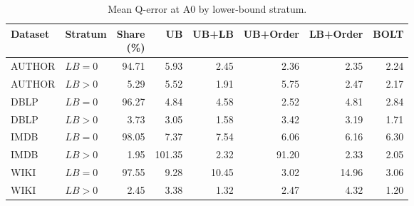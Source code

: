 \begin{table}[!t]
\centering
\small
\setlength{\tabcolsep}{1.5pt}
\caption{Mean Q-error at A0 by lower-bound stratum.}
\label{tab:lb-conditional}
\begin{tabular*}{\columnwidth}{@{\extracolsep{\fill}}llrrrrrr@{}}
\toprule
Dataset & Stratum & \shortstack{Share\\(\%)} & UB & UB+LB & UB+Order & LB+Order & BOLT \\
\midrule
AUTHOR & $LB=0$ & 94.71 & 5.93 & 2.45 & 2.36 & 2.35 & 2.24 \\
AUTHOR & $LB>0$ & 5.29 & 5.52 & 1.91 & 5.75 & 2.47 & 2.17 \\
DBLP & $LB=0$ & 96.27 & 4.84 & 4.58 & 2.52 & 4.81 & 2.84 \\
DBLP & $LB>0$ & 3.73 & 3.05 & 1.58 & 3.42 & 3.19 & 1.71 \\
IMDB & $LB=0$ & 98.05 & 7.37 & 7.54 & 6.06 & 6.16 & 6.30 \\
IMDB & $LB>0$ & 1.95 & 101.35 & 2.32 & 91.20 & 2.33 & 2.05 \\
WIKI & $LB=0$ & 97.55 & 9.28 & 10.45 & 3.02 & 14.96 & 3.06 \\
WIKI & $LB>0$ & 2.45 & 3.38 & 1.32 & 2.47 & 4.32 & 1.20 \\
\bottomrule
\end{tabular*}
\end{table}
